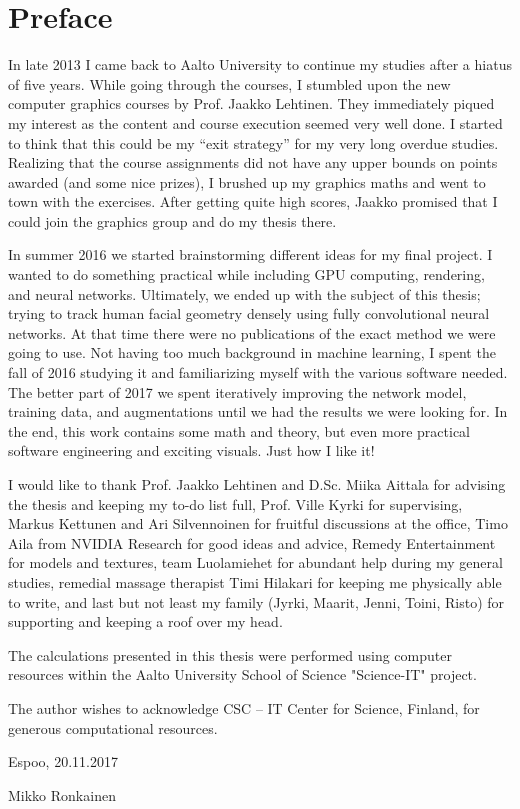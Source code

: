 \begingroup
\let\clearpage\relax
\let\cleardoublepage\relax
\let\cleardoublepage\relax
\chapter*{Preface}

In late 2013 I came back to Aalto University to continue my studies after a hiatus of five years. While going through the courses, I stumbled upon the new computer graphics courses by Prof. Jaakko Lehtinen. They immediately piqued my interest as the content and course execution seemed very well done. I started to think that this could be my ``exit strategy'' for my very long overdue studies. Realizing that the course assignments did not have any upper bounds on points awarded (and some nice prizes), I brushed up my graphics maths and went to town with the exercises. After getting quite high scores, Jaakko promised that I could join the graphics group and do my thesis there.

In summer 2016 we started brainstorming different ideas for my final project. I wanted to do something practical while including GPU computing, rendering, and neural networks. Ultimately, we ended up with the subject of this thesis; trying to track human facial geometry densely using fully convolutional neural networks. At that time there were no publications of the exact method we were going to use. Not having too much background in machine learning, I spent the fall of 2016 studying it and familiarizing myself with the various software needed. The better part of 2017 we spent iteratively improving the network model, training data, and augmentations until we had the results we were looking for. In the end, this work contains some math and theory, but even more practical software engineering and exciting visuals. Just how I like it!

I would like to thank Prof. Jaakko Lehtinen and D.Sc. Miika Aittala for advising the thesis and keeping my to-do list full, Prof. Ville Kyrki for supervising, Markus Kettunen and Ari Silvennoinen for fruitful discussions at the office, Timo Aila from NVIDIA Research for good ideas and advice, Remedy Entertainment for models and textures, team Luolamiehet for abundant help during my general studies, remedial massage therapist Timi Hilakari for keeping me physically able to write, and last but not least my family (Jyrki, Maarit, Jenni, Toini, Risto) for supporting and keeping a roof over my head.

\bigskip

The calculations presented in this thesis were performed using computer resources within the Aalto University School of Science "Science-IT" project.

\bigskip

The author wishes to acknowledge CSC – IT Center for Science, Finland, for generous computational resources.

\bigskip

\noindent Espoo, 20.11.2017

\noindent Mikko Ronkainen

\endgroup
